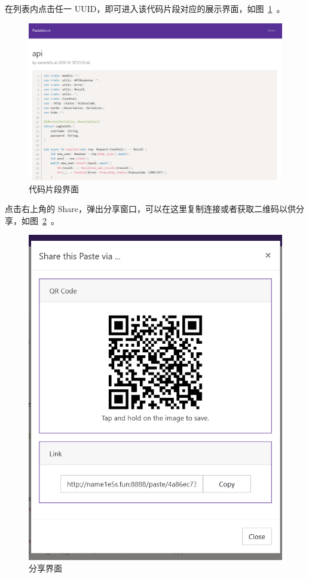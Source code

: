 \documentclass[ichigo,normal,cn]{elegantnote}
\begin{document}
在列表内点击任一 UUID，即可进入该代码片段对应的展示界面，如图~\ref{fig:paste}~。

\begin{figure}[!htbp]
    \centering
    \includegraphics[width=.8\textwidth]{paste}
    \caption{代码片段界面}
    \label{fig:paste}
\end{figure}

点击右上角的 Share，弹出分享窗口，可以在这里复制连接或者获取二维码以供分享，如图~\ref{fig:share}~。

\begin{figure}[!htbp]
    \centering
    \includegraphics[width=.5\textwidth]{share}
    \caption{分享界面}
    \label{fig:share}
\end{figure}
\end{document}
